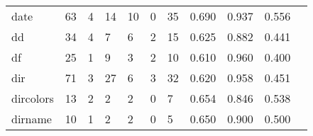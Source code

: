 \begin{longtable}{lp{1.2cm}p{1.2cm}p{1.2cm}p{1.2cm}p{1.2cm}p{1.2cm}p{1.2cm}p{1.2cm}p{1.2cm}p{1.2cm}}
date      &                                    63 &                                                  4 &                                                 14 &                                                 10 &                                                  0 &                                                 35 &                                              0.690 &                                              0.937 &                                              0.556 \\
dd        &                                    34 &                                                  4 &                                                  7 &                                                  6 &                                                  2 &                                                 15 &                                              0.625 &                                              0.882 &                                              0.441 \\
df        &                                    25 &                                                  1 &                                                  9 &                                                  3 &                                                  2 &                                                 10 &                                              0.610 &                                              0.960 &                                              0.400 \\
dir       &                                    71 &                                                  3 &                                                 27 &                                                  6 &                                                  3 &                                                 32 &                                              0.620 &                                              0.958 &                                              0.451 \\
dircolors &                                    13 &                                                  2 &                                                  2 &                                                  2 &                                                  0 &                                                  7 &                                              0.654 &                                              0.846 &                                              0.538 \\
dirname   &                                    10 &                                                  1 &                                                  2 &                                                  2 &                                                  0 &                                                  5 &                                              0.650 &                                              0.900 &                                              0.500 \\

\end{longtable}
